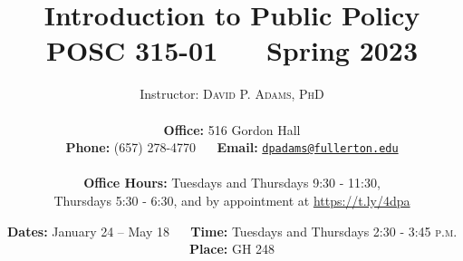 \documentclass[11pt]{article}
\begin{document}
		
	
	\title{\textbf{Introduction to Public Policy} \\
			POSC 315-01 ~\textbullet~ Spring 2023}
	
	\author{	
			\Large{Instructor: \textsc{David P. Adams, PhD }} \\ \\
			\textbf{Office:} 516 Gordon Hall \\ 
			\textbf{Phone:} (657) 278-4770 ~\textbullet~ \textbf{Email:} \href{mailto:dpadams@fullerton.edu}{\texttt{dpadams@fullerton.edu}} \\\\
			\textbf{Office Hours:}  Tuesdays and Thursdays 9:30 - 11:30, \\  Thursdays 5:30 - 6:30, and by appointment at \url{https://t.ly/4dpa}}
			

\date{ \textbf{Dates:} January 24 -- May 18 ~\textbullet~ \textbf{Time:} Tuesdays and Thursdays 2:30 - 3:45 \textsc{p.m.} \\\vspace{1ex} \textbf{Place:} GH 248}

\maketitle
\end{document}
